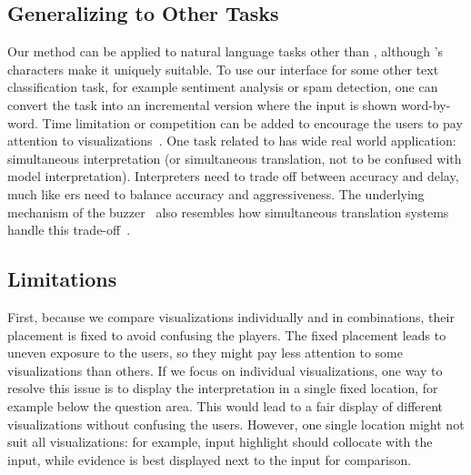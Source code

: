 
\subsection{Generalizing to Other Tasks}
Our method can be applied to natural language tasks other than
\qb{}, although \qb{}'s characters make it uniquely suitable.  To use
our interface for some other text classification task, for example
sentiment analysis or spam detection, one can convert the task into an
incremental version where the input is shown
word-by-word. Time limitation or competition can be added to
encourage the users to pay attention to
visualizations~\cite{narayanan2018humans}. One task
related to \qb{} has wide real world application: simultaneous
interpretation (or simultaneous translation, not to be
confused with model interpretation). Interpreters need to trade off
between accuracy and delay, much like \qb{}ers need to balance
accuracy and aggressiveness. The underlying mechanism of the
 buzzer~\cite{he2016opponent} also resembles how
simultaneous translation systems handle this
trade-off~\cite{grissom:he:boyd-graber:morgan-2014}.

\subsection{Limitations}
First, because we
compare visualizations individually and in combinations, their
placement is fixed to avoid confusing the players. The fixed
placement leads to uneven exposure to the users, so they might pay
less attention to some visualizations than others. If we focus on
individual visualizations, one way to resolve this issue is to display
the interpretation in a single fixed location, for example below the
question area. This would lead to a fair display of different
visualizations without confusing the users. However, one single
location might not suit all visualizations: for example, input
highlight should collocate with the input, while evidence is best
displayed next to the input for comparison.


